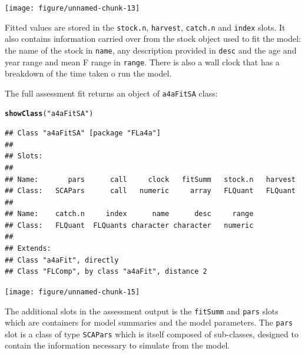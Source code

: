 \documentclass[a4paper,english,10pt]{article}\usepackage[]{graphicx}\usepackage[]{color}
\makeatletter
\newcommand{\hlstr}[1]{\textcolor[rgb]{0.192,0.494,0.8}{#1}}%
\newcommand{\hlstd}[1]{\textcolor[rgb]{0.345,0.345,0.345}{#1}}%
\newcommand{\hlkwd}[1]{\textcolor[rgb]{0.737,0.353,0.396}{\textbf{#1}}}%
\newenvironment{kframe}{%
 \def\at@end@of@kframe{}%
 \ifinner\ifhmode%
  \def\at@end@of@kframe{\end{minipage}}%
  \begin{minipage}{\columnwidth}%
 \fi\fi%
 \def\FrameCommand##1{\hskip\@totalleftmargin \hskip-\fboxsep
 \colorbox{shadecolor}{##1}\hskip-\fboxsep
     \hskip-\linewidth \hskip-\@totalleftmargin \hskip\columnwidth}%
 \MakeFramed {\advance\hsize-\width
   \@totalleftmargin\z@ \linewidth\hsize
   \@setminipage}}%
 {\par\unskip\endMakeFramed%
 \at@end@of@kframe}
\newenvironment{knitrout}{}{} %
\makeatother
\begin{document}
\begin{knitrout}
\color{fgcolor}

{\centering \texttt{[image: figure/unnamed-chunk-13]} 

}



\end{knitrout}


Fitted values are stored in the \texttt{stock.n}, \texttt{harvest}, \texttt{catch.n} and \texttt{index} slots.  It also contains information carried over from the stock object used to fit the model: the name of the stock in \texttt{name}, any description provided in \texttt{desc} and the age and year range and mean F range in \texttt{range}.  There is also a wall clock that has a breakdown of the time taken o run the model.

The full assessment fit returns an object of \texttt{a4aFitSA} class:

\begin{knitrout}
\color{fgcolor}\begin{kframe}
\begin{alltt}
\hlkwd{showClass}\hlstd{(}\hlstr{"a4aFitSA"}\hlstd{)}
\end{alltt}
\begin{verbatim}
## Class "a4aFitSA" [package "FLa4a"]
## 
## Slots:
##                                                                   
## Name:       pars      call     clock   fitSumm   stock.n   harvest
## Class:   SCAPars      call   numeric     array   FLQuant   FLQuant
##                                                         
## Name:    catch.n     index      name      desc     range
## Class:   FLQuant  FLQuants character character   numeric
## 
## Extends: 
## Class "a4aFit", directly
## Class "FLComp", by class "a4aFit", distance 2
\end{verbatim}
\end{kframe}
\end{knitrout}


\begin{knitrout}
\color{fgcolor}

{\centering \texttt{[image: figure/unnamed-chunk-15]} 

}



\end{knitrout}


The additional slots in the assessment output is the \texttt{fitSumm} and \texttt{pars} slots which are containers for model summaries and the model parameters.  The \texttt{pars} slot is a class of type \texttt{SCAPars} which is itself composed of sub-classes, designed to contain the information necessary to simulate from the model.
\end{document}
